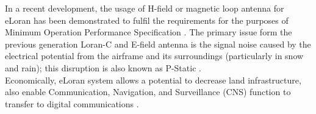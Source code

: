 \noindent In a recent development, the usage of H-field or magnetic loop antenna for eLoran has been demonstrated to fulfil the requirements for the purposes of Minimum Operation Performance Specification \cite{Anonymous2016ELoranLight}. The primary issue form the previous generation Loran-C and E-field antenna is the signal noise caused by the electrical potential from the airframe and its surroundings (particularly in snow and rain); this disruption is also known as P-Static \cite{BartoneH-fieldApplications}.\\

\noindent Economically, eLoran system allows a potential to decrease land infrastructure, also enable Communication, Navigation, and Surveillance (CNS) function to transfer to digital communications \cite{InternationalLORANAssociation2007EnhancedApril}.









